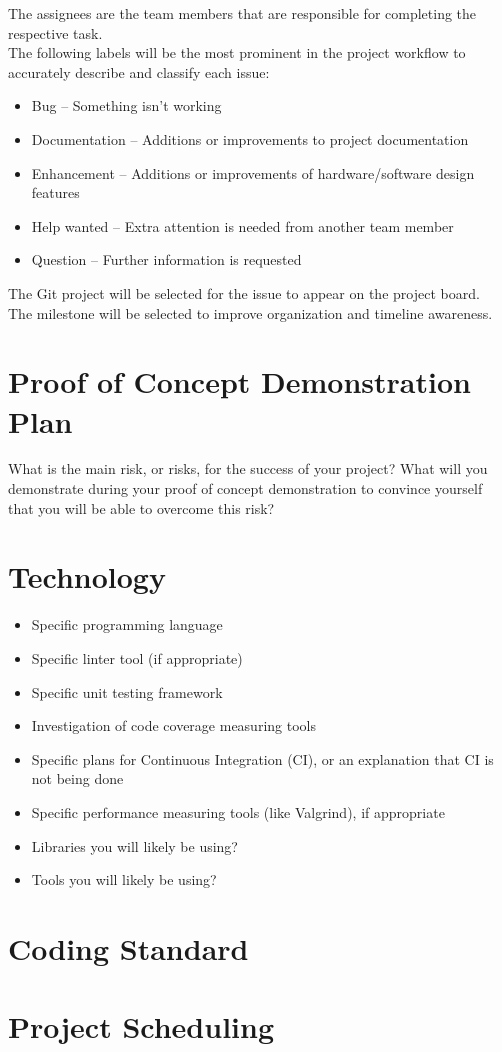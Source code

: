 \documentclass{article}
\begin{document}
	\noindent The assignees are the team members that are responsible for completing the respective task.\\

	\noindent The following labels will be the most prominent in the project workflow to accurately describe and classify each issue: 

	\begin{itemize}
		\item Bug – Something isn’t working
		\item Documentation – Additions or improvements to project documentation 
		\item Enhancement – Additions or improvements of hardware/software design features 
		\item Help wanted – Extra attention is needed from another team member 
		\item Question – Further information is requested 
	\end{itemize}
	\noindent The Git project will be selected for the issue to appear on the project board.\\

	\noindent The milestone will be selected to improve organization and timeline awareness.\\
	
	\section{Proof of Concept Demonstration Plan}
	
	What is the main risk, or risks, for the success of your project?  What will you
	demonstrate during your proof of concept demonstration to convince yourself that
	you will be able to overcome this risk?
	
	\section{Technology}
	
	\begin{itemize}
	\item Specific programming language
	\item Specific linter tool (if appropriate)
	\item Specific unit testing framework
	\item Investigation of code coverage measuring tools
	\item Specific plans for Continuous Integration (CI), or an explanation that CI
	  is not being done
	\item Specific performance measuring tools (like Valgrind), if
	  appropriate
	\item Libraries you will likely be using?
	\item Tools you will likely be using?
	\end{itemize}
	
	\section{Coding Standard}
	
	\section{Project Scheduling}
	
\end{document}
